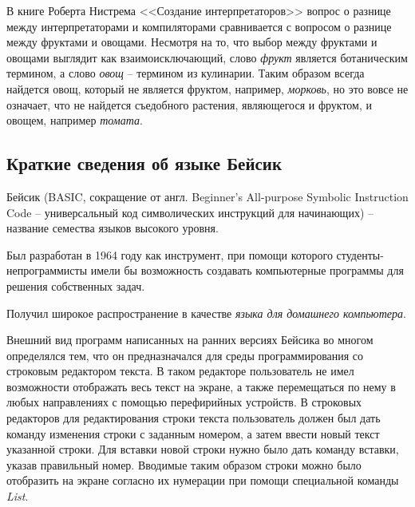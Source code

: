 В книге Роберта Нистрема <<Создание интерпретаторов>> вопрос
о разнице между интерпретаторами и компиляторами сравнивается
с вопросом о разнице между фруктами и овощами.
Несмотря на то, что выбор между фруктами и овощами выглядит
как взаимоисключающий, слово \emph{фрукт} является ботаническим
термином, а слово \emph{овощ} -- термином из кулинарии.
Таким образом всегда найдется овощ, который не является фруктом,
например, \emph{морковь}, но это вовсе не означает, что не найдется 
съедобного растения, являющегося и фруктом, и овощем, 
например \emph{томата}.

\subsection{Краткие сведения об языке Бейсик}

Бейсик (BASIC, 
сокращение от англ. Beginner's All-purpose Symbolic Instruction Code 
-- универсальный код символических инструкций для начинающих) 
-- название семества языков высокого уровня.

Был разработан в 1964 году как инструмент,
при помощи которого студенты-непрограммисты
имели бы возможность создавать компьютерные программы для решения
собственных задач. 

Получил широкое распространение в качестве 
\emph{языка для домашнего компьютера}.

Внешний вид программ написанных на ранних версиях Бейсика
во многом определялся тем, что он предназначался для 
среды программирования со строковым редактором текста.
В таком редакторе пользователь не имел возможности отображать
весь текст на экране, а также перемещаться по нему в любых
направлениях с помощью перефирийных устройств.
В строковых редакторов для редактирования строки текста
пользователь должен был дать команду изменения строки с заданным
номером, а затем ввести новый текст указанной строки.
Для вставки новой строки нужно было дать команду вставки,
указав правильный номер.
Вводимые таким образом строки можно было отобразить на экране
согласно их нумерации при помощи специальной команды \emph{List}.


